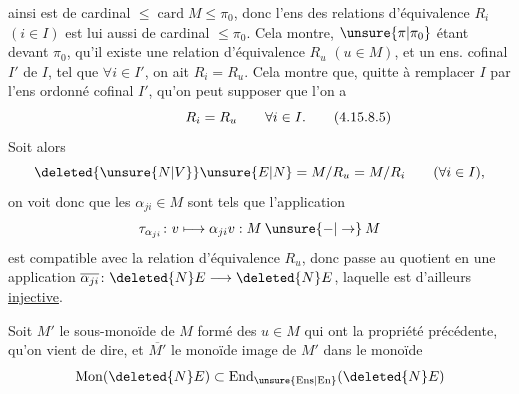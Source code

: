 
 ainsi est de cardinal $\leq\operatorname{card} M\leq\pi_0$, donc l'ens des relations d'équivalence $R_i$ $(i\in I)$ est lui aussi de cardinal $\leq\pi_0$. Cela montre, $\unsure{\pi|\pi_0}$ étant  devant $\pi_0$, qu'il existe une relation d'équivalence  $R_u$ $(u\in M)$, et un ens. cofinal $I'$ de $I$, tel que $\forall i\in I'$, on ait $R_i=R_u$. Cela montre que, quitte
à remplacer $I$ par l'ens ordonné cofinal $I'$, qu'on peut supposer que l'on a
\[
R_i=R_u\qquad\forall i\in I.
\tag*{\makebox[0pt][r]{\makebox[\displaywidth][l]{(4.15.8.5)}}}
\]
Soit alors
\[
\deleted{\unsure{N|V}}\unsure{E|N}=M/R_u=M/R_i\qquad(\forall i\in I),
\]
on voit donc que les $\alpha_{ji}\in M$  sont tels que l'application
\[
\tau_{\alpha_{ji}}\colon v\longmapsto\alpha_{ji}v:M\mathbin{\unsure{-|\to}}M
\]
est compatible avec la relation d'équivalence $R_u$, donc passe au quotient en une
application $\overline{\alpha_{ji}}\colon\deleted{N}E\longrightarrow\deleted{N}E$,  laquelle est d'ailleurs \uline{injective}.

Soit $M'$ le sous-monoïde de $M$ formé des $u\in M$ qui ont la propriété  précédente,   qu'on vient de dire, et $\overline{M'}$ le monoïde  image de $M'$ dans le monoïde
\[
\operatorname{Mon}(\deleted{N}E)\subset\operatorname{End}_{\unsure{\mathrm{Ens}|\mathrm{En}}}(\deleted{N}E)
\]
